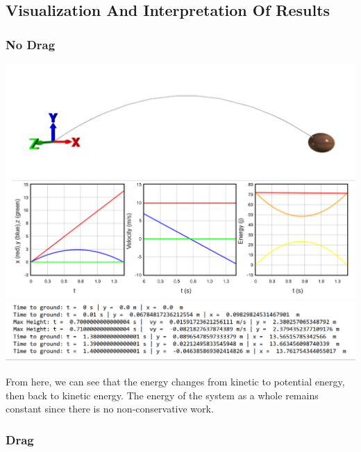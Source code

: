 \documentclass[11pt]{article}
\begin{document}
    \hypertarget{visualization-and-interpretation-of-results}{%
\subsection{Visualization And Interpretation Of
Results}\label{visualization-and-interpretation-of-results}}

\hypertarget{no-drag}{%
\subsubsection{No Drag}\label{no-drag}}

\includegraphics{images/no_drag/vis.png}
\includegraphics{images/no_drag/graph.png}
\includegraphics{images/no_drag/output.png}

From here, we can see that the energy changes from kinetic to potential
energy, then back to kinetic energy. The energy of the system as a whole
remains constant since there is no non-conservative work.

    \hypertarget{drag}{%
\subsubsection{Drag}\label{drag}}
\end{document}
